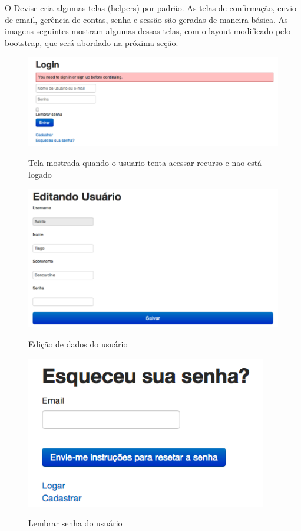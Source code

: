     O Devise cria algumas telas (helpers) por padrão. As telas de confirmação, envio de email, gerência de contas, senha e sessão são geradas de maneira básica. As imagens seguintes mostram algumas dessas telas, com o layout modificado pelo bootstrap, que será abordado na próxima seção.
	 \begin{figure}[H]
	   \centering
	   \includegraphics{figs/railslogin.png}\\
	   \caption{ Tela mostrada quando o usuario tenta acessar recurso e nao está logado }
	   \label{FIG:railslogin}
	 \end{figure}
	 
	 \begin{figure}[H]
	   \centering
	   \includegraphics{figs/railsedituser.png}\\
	   \caption{ Edição de dados do usuário }
	   \label{FIG:railsuseredit}
	 \end{figure}
	 
	 \begin{figure}[H]
	   \centering
	   \includegraphics{figs/railsforgetpass.png}\\
	   \caption{ Lembrar senha do usuário }
	   \label{FIG:railsforgetpass}
	 \end{figure}

